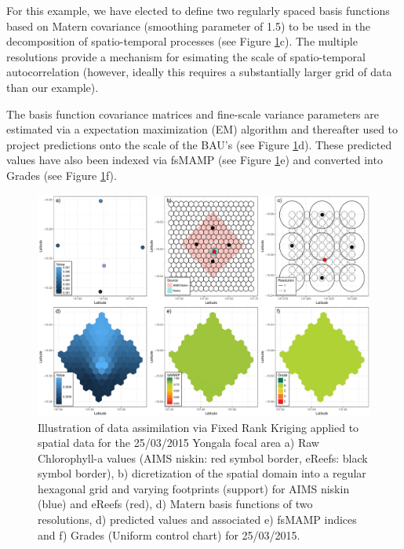 For this example, we have elected to define two regularly spaced basis functions based on Matern covariance (smoothing parameter of 1.5)
to be used in the decomposition of spatio-temporal processes (see Figure \ref{fig:focalArea_Spatial.Yongala_Measure.chl_Method3}c).
The multiple resolutions provide a mechanism
for esimating the scale of spatio-temporal autocorrelation (however, ideally this requires a substantially
larger grid of data than our example).

The basis function covariance matrices and fine-scale variance parameters are estimated via a expectation maximization (EM)
algorithm and thereafter used to project predictions onto the scale of the BAU's (see Figure \ref{fig:focalArea_Spatial.Yongala_Measure.chl_Method3}d).
These predicted values have also been indexed via fsMAMP (see Figure \ref{fig:focalArea_Spatial.Yongala_Measure.chl_Method3}e) and
converted into Grades (see Figure \ref{fig:focalArea_Spatial.Yongala_Measure.chl_Method3}f).

\begin{figure}[!hptb]
  \includegraphics[width=\textwidth]{figures/FocalAreas/focalArea_Spatial.Yongala_Measure.chl_Method3.pdf}
    \caption[Illustration of Fixed Rank Kriging multi source aggregation for the Yongala focal area]{Illustration of data assimilation via Fixed Rank Kriging applied to spatial data for the 25/03/2015 Yongala focal area a) Raw Chlorophyll-a values (AIMS niskin: red symbol border, eReefs: black symbol border), b) dicretization of the spatial domain into a regular hexagonal grid and varying footprints (support) for AIMS niskin (blue) and eReefs (red), d) Matern basis functions of two resolutions, d) predicted values and associated e) fsMAMP indices and f) Grades (Uniform control chart) for 25/03/2015.}\label{fig:focalArea_Spatial.Yongala_Measure.chl_Method3}
\end{figure}

